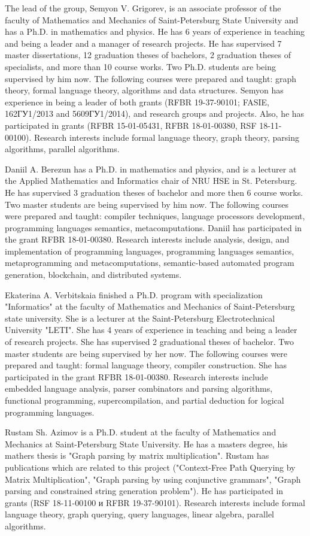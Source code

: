\documentclass[12pt]{article}  %
\theoremstyle{remark}
\begin{document}
The lead of the group, Semyon V. Grigorev, is an associate professor of the faculty of Mathematics and Mechanics of Saint-Petersburg State University and has a Ph.D. in mathematics and physics.
He has 6 years of experience in teaching and being a leader and a manager of research projects. 
He has supervised 7 master dissertations, 12 graduation theses of bachelors, 2 graduation theses of specialists, and more than 10 course works. 
Two Ph.D. students are being supervised by him now. 
The following courses were prepared and taught: graph theory, formal language theory, algorithms and data structures.
Semyon has experience in being a leader of both grants  (RFBR 19-37-90101; FASIE, 162ГУ1/2013 and 5609ГУ1/2014), and research groups and projects. 
Also, he has participated in grants (RFBR 15-01-05431, RFBR 18-01-00380, RSF 18-11-00100). 
Research interests include formal language theory, graph theory, parsing algorithms, parallel algorithms.

Daniil A. Berezun has a Ph.D. in mathematics and physics, and is a lecturer at the Applied Mathematics and Informatics chair of NRU HSE in St. Petersburg. 
He has supervised 3 graduation theses of bachelor and more then 6 course works. 
Two master students are being supervised by him now.
The following courses were prepared and taught: compiler techniques, language processors development, programming languages semantics, metacomputations.
Daniil has participated in the grant RFBR 18-01-00380. Research interests include analysis, design, and implementation of programming languages, programming languages semantics, metaprogramming and metacomputations, semantic-based automated program generation, blockchain, and distributed systems.

Ekaterina A. Verbitskaia finished a Ph.D. program with specialization "Informatics" at the faculty of Mathematics and Mechanics of Saint-Petersburg state university. She is a lecturer at the Saint-Petersburg Electrotechnical University "LETI".
She has 4 years of experience in teaching and being a leader of research projects. 
She has supervised 2 graduational theses of bachelor. 
Two master students are being supervised by her now. 
The following courses were prepared and taught: formal language theory, compiler construction. 
She has participated in the grant RFBR 18-01-00380.
Research interests include embedded language analysis, parser combinators and parsing algorithms, functional programming, supercompilation, and partial deduction for logical programming languages.

Rustam Sh. Azimov is a Ph.D. student at the faculty of Mathematics and Mechanics at Saint-Petersburg State University.
He has a masters degree, his mathers thesis is "Graph parsing by matrix multiplication". 
Rustam has publications which are related to this project ("Context-Free Path Querying by Matrix Multiplication", "Graph parsing by using conjunctive grammars", "Graph parsing and constrained string generation problem"). 
He has participated in grants (RSF 18-11-00100 и RFBR 19-37-90101).
Research interests include formal language theory, graph querying, query languages, linear algebra, parallel algorithms.
\end{document}
